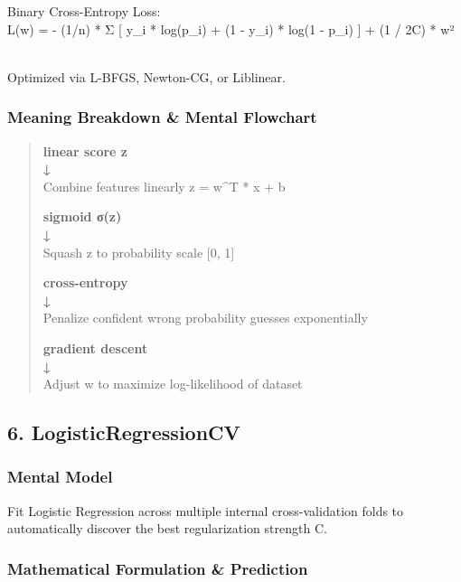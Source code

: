 \documentclass[
  10pt,
  letterpaper,
]{article}
\begin{document}
Binary Cross-Entropy Loss:\\
L(w) = - (1/n) * Σ {[} y\_i * log(p\_i) + (1 - y\_i) * log(1 - p\_i) {]} + (1 / 2C) * \textbar\textbar w\textbar\textbar²\\
\strut \\
Optimized via L-BFGS, Newton-CG, or Liblinear.

\hypertarget{meaning-breakdown-mental-flowchart-4}{%
\subsubsection{Meaning Breakdown \& Mental Flowchart}\label{meaning-breakdown-mental-flowchart-4}}

\begin{quote}
\textbf{linear score z\\
↓\\
}Combine features linearly z = w\^{}T * x + b

\textbf{sigmoid σ(z)\\
↓\\
}Squash z to probability scale {[}0, 1{]}

\textbf{cross-entropy\\
↓\\
}Penalize confident wrong probability guesses exponentially

\textbf{gradient descent\\
↓\\
}Adjust w to maximize log-likelihood of dataset
\end{quote}

\hypertarget{logisticregressioncv}{%
\subsection{6. LogisticRegressionCV}\label{logisticregressioncv}}

\hypertarget{mental-model-5}{%
\subsubsection{Mental Model}\label{mental-model-5}}

Fit Logistic Regression across multiple internal cross-validation folds to automatically discover the best regularization strength C.

\hypertarget{mathematical-formulation-prediction-5}{%
\subsubsection{Mathematical Formulation \& Prediction}\label{mathematical-formulation-prediction-5}}
\end{document}
